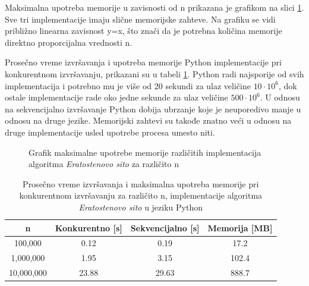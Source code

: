 \documentclass[12pt,oneside]{memoir}
\begin{document}
Maksimalna upotreba memorije u zavisnosti od n prikazana je grafikom na slici \ref{fig:prime2}. Sve tri implementacije imaju slične memorijske zahteve. Na grafiku se vidi približno linearna zavisnost y=x, što znači da je potrebna količina memorije direktno proporcijalna vrednosti n.

Prosečno vreme izvršavanja i upotreba memorije Python implementacije pri konkurentnom izvršavanju, prikazani su u tabeli \ref{tab:prime1}. Python radi najsporije od svih implementacija i potrebno mu je više od 20 sekundi za ulaz veličine $10\cdot10^{6}$, dok ostale implementacije rade oko jedne sekunde za ulaz veličine $500\cdot10^{6}$. U odnosu na sekvencijalno izvršavanje Python dobija ubrzanje koje je neuporedivo manje u odnosu na druge jezike. Memorijski zahtevi su takođe znatno veći u odnosu na druge implementacije usled upotrebe procesa umesto niti.

\begin{figure}[H]
\begin{center}


\caption{Grafik maksimalne upotrebe memorije različitih implementacija algoritma \textit{Eratostenovo sito} za različito n}
\label{fig:prime2}
\end{center}
\end{figure}

\begin{table}[H]
\begin{center}
\caption{Prosečno vreme izvršavanja i maksimalna upotreba memorije pri konkurentnom izvršavanju za različito n, implementacije algoritma \textit{Eratostenovo sito} u jeziku Python}
\begin{tabular}{||c||c|c|c||}
\hline
n & Konkurentno [s]& Sekvencijalno [s] & Memorija [MB] \\ \hline
100,000	&0.12	&0.19&17.2\\
1,000,000	&1.95	&3.15&102.4\\
10,000,000	&23.88&29.63&888.7\\
\hline
\end{tabular}
\label{tab:prime1}
\end{center}
\end{table}
\end{document}

